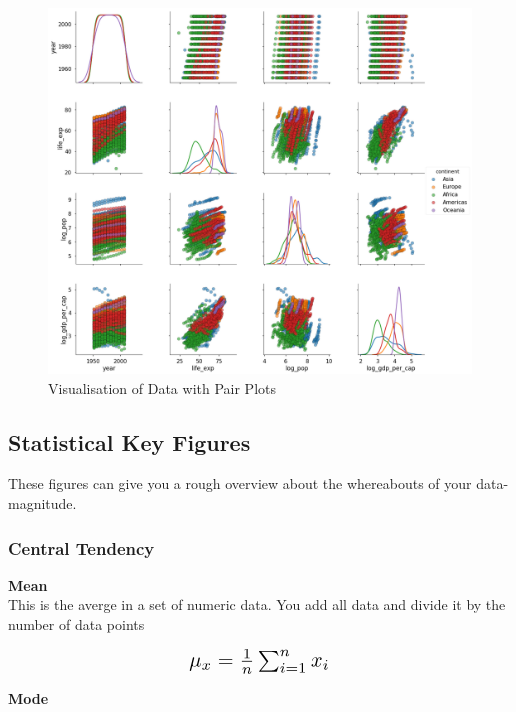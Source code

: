 \documentclass[a4paper, 11pt]{article}
\begin{document}
\begin{figure}[htb!]
    \centering
    \includegraphics[keepaspectratio=true, width=0.4\textheight]{pair_plots.png}
    \caption{Visualisation of Data with Pair Plots}
    \label{fig:pair_plots}
\end{figure}

\newpage

\subsection{Statistical Key Figures}

These figures can give you a rough overview about the whereabouts of your data-magnitude.

\subsubsection{Central Tendency}

\textbf{Mean} \\

This is the averge in a set of numeric data. You add all data and divide it by the number of data points

\[ \scalebox{1.5}{
        $\mu_{x}=\frac{1}{n} \sum^{n}_{i=1} x_{i}$
}\]

\vspace{10px}

\noindent \textbf{Mode} \\
\end{document}
